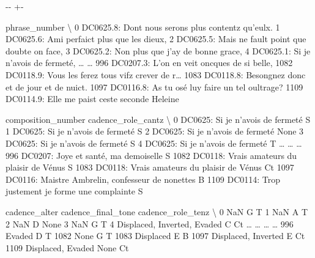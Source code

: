 \documentclass[letterpaper,10pt,english]{sphinxmanual}
\newlength\nbsphinxcodecellspacing
\begin{document}
{

\kern-\sphinxverbatimsmallskipamount\kern-\baselineskip
\kern+\FrameHeightAdjust\kern-\fboxrule
\vspace{\nbsphinxcodecellspacing}

\begin{sphinxVerbatim}[commandchars=\\\{\}]
\llap{\color{nbsphinxout}[27]:\,\hspace{\fboxrule}\hspace{\fboxsep}}                                          phrase\_number  \textbackslash{}
0     DC0625.8: Dont nous serons plus contentz qu'eulx.
1            DC0625.6: Ami perfaict plus que les dieux,
2     DC0625.5: Mais ne fault point que doubte on face,
3           DC0625.2: Non plus que j'ay de bonne grace,
4                   DC0625.1: Si je n'avois de fermeté,
{\ldots}                                                 {\ldots}
996         DC0207.3: L’on en veit oncques de si belle,
1082  DC0118.9: Vous les ferez tous vifz crever de r{\ldots}
1083   DC0118.8: Besongnez donc et de jour et de nuict.
1097     DC0116.8: As tu osé luy faire un tel oultrage?
1109      DC0114.9: Elle me paist ceste seconde Heleine

                                    composition\_number cadence\_role\_cantz  \textbackslash{}
0                     DC0625: Si je n'avois de fermeté                  S
1                     DC0625: Si je n'avois de fermeté                  S
2                     DC0625: Si je n'avois de fermeté               None
3                     DC0625: Si je n'avois de fermeté                  S
4                     DC0625: Si je n'avois de fermeté                  T
{\ldots}                                                {\ldots}                {\ldots}
996               DC0207: Joye et santé, ma demoiselle                  S
1082        DC0118: Vrais amateurs du plaisir de Vénus                  S
1083        DC0118: Vrais amateurs du plaisir de Vénus                 Ct
1097  DC0116: Maistre Ambrelin, confesseur de nonettes                  B
1109    DC0114: Trop justement je forme une complainte                  S

                    cadence\_alter cadence\_final\_tone cadence\_role\_tenz  \textbackslash{}
0                             NaN                  G                 T
1                             NaN                  A                 T
2                             NaN                  D              None
3                             NaN                  G                 T
4     Displaced, Inverted, Evaded                  C                Ct
{\ldots}                           {\ldots}                {\ldots}               {\ldots}
996                        Evaded                  D                 T
1082                         None                  G                 T
1083                    Displaced                  E                 B
1097          Displaced, Inverted                  E                Ct
1109            Displaced, Evaded               None                Ct


\end{sphinxVerbatim}}
\end{document}
